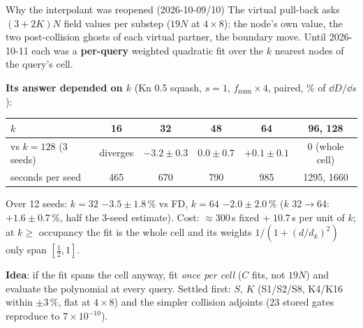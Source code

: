 \documentclass[10pt,aspectratio=169]{beamer}
\begin{document}
\begin{frame}{Why the interpolant was reopened (2026-10-09/10)}
\small
The virtual pull-back asks $(3+2K)N$ field values per substep ($19N$ at $4\times8$): the node's own value,
the two post-collision ghosts of each virtual partner, the boundary move.  Until 2026-10-11 each was a
\textbf{per-query} weighted quadratic fit over the $k$ nearest nodes of the query's cell.

\medskip
\textbf{Its answer depended on $k$} (Kn 0.5 squash, $s = 1$, $f_{\mathrm{num}}\times4$, paired, \% of $\dd D/\dd s$):
\begin{center}
\begin{tabular}{@{}lccccc@{}}
\toprule
$k$ & 16 & 32 & 48 & 64 & 96, 128\\
\midrule
vs $k = 128$ (3 seeds) & diverges & $-3.2\pm0.3$ & $0.0\pm0.7$ & $+0.1\pm0.1$ & $0$ (whole cell)\\
seconds per seed & 465 & 670 & 790 & 985 & 1295, 1660\\
\bottomrule
\end{tabular}
\end{center}
Over 12 seeds: $k = 32$ $-3.5\pm1.8\,\%$ vs FD, $k = 64$ $-2.0\pm2.0\,\%$ ($k$ 32$\to$64: $+1.6\pm0.7\,\%$,
half the 3-seed estimate).  Cost: $\approx300$\,s fixed $+\;10.7$\,s per unit of $k$; at $k\ge$ occupancy
the fit is the whole cell and its weights $1/(1+(d/d_k)^2)$ only span $[\tfrac12,1]$.

\medskip
\textbf{Idea}: if the fit spans the cell anyway, fit \emph{once per cell} ($C$ fits, not $19N$) and evaluate
the polynomial at every query.  Settled first: $S$, $K$ (S1/S2/S8, K4/K16 within $\pm3\,\%$, flat at
$4\times8$) and the simpler collision adjoints (23 stored gates reproduce to $7\times10^{-10}$).
\end{frame}
\end{document}
